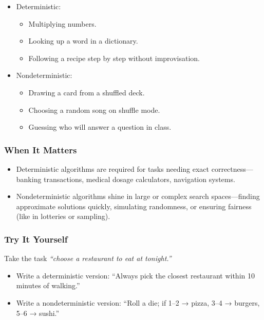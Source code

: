 \documentclass[
  letterpaper,
  DIV=11,
  numbers=noendperiod]{scrreprt}
\providecommand{\tightlist}{%
  \setlength{\itemsep}{0pt}\setlength{\parskip}{0pt}}
\begin{document}
\begin{itemize}
\item
  Deterministic:

  \begin{itemize}
  \tightlist
  \item
    Multiplying numbers.
  \item
    Looking up a word in a dictionary.
  \item
    Following a recipe step by step without improvisation.
  \end{itemize}
\item
  Nondeterministic:

  \begin{itemize}
  \tightlist
  \item
    Drawing a card from a shuffled deck.
  \item
    Choosing a random song on shuffle mode.
  \item
    Guessing who will answer a question in class.
  \end{itemize}
\end{itemize}

\subsubsection{When It Matters}\label{when-it-matters}

\begin{itemize}
\tightlist
\item
  Deterministic algorithms are required for tasks needing exact
  correctness---banking transactions, medical dosage calculators,
  navigation systems.
\item
  Nondeterministic algorithms shine in large or complex search
  spaces---finding approximate solutions quickly, simulating randomness,
  or ensuring fairness (like in lotteries or sampling).
\end{itemize}

\subsubsection{Try It Yourself}\label{try-it-yourself-2}

Take the task \emph{``choose a restaurant to eat at tonight.''}

\begin{itemize}
\tightlist
\item
  Write a deterministic version: ``Always pick the closest restaurant
  within 10 minutes of walking.''
\item
  Write a nondeterministic version: ``Roll a die; if 1--2 → pizza, 3--4
  → burgers, 5--6 → sushi.''
\end{itemize}
\end{document}
